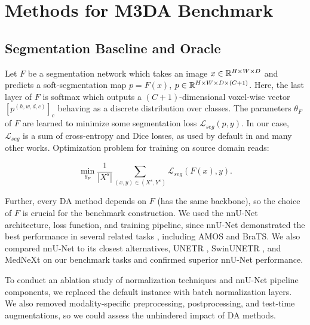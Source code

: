 


\section{Methods for M3DA Benchmark}
\label{sec:methods}




\subsection{Segmentation Baseline and Oracle}
\label{ssec:baseline}

Let $F$ be a segmentation network which takes an image $x \in \mathbb{R}^{H \times W \times D}$ and predicts a soft-segmentation map $p = F(x)$, $p \in \mathbb{R}^{H \times W \times D \times (C + 1)}$. Here, the last layer of $F$ is softmax which outputs a $(C+1)$-dimensional voxel-wise vector $\left[p^{(h, w, d, c)}\right]_c$ behaving as a discrete distribution over classes. The parameters $\theta_F$ of $F$ are learned to minimize some segmentation loss $\mathcal{L}_{seg} (p, y)$. In our case, $\mathcal{L}_{seg}$ is a sum of cross-entropy and Dice losses, as used by default in \cite{nnunet} and many other works. Optimization problem for training on source domain reads:

\[
\min_{\theta_F} \frac{1}{|X^s|} \sum_{(x, y) \in (X^s, Y^s)} \mathcal{L}_{seg} (F(x), y).
\]

Further, every DA method depends on $F$ (has the same backbone), so the choice of $F$ is crucial for the benchmark construction. We used the nnU-Net \cite{nnunet} architecture, loss function, and training pipeline, since nnU-Net demonstrated the best performance in several related tasks \cite{nnunet,amos,isensee2024nnu}, including AMOS and BraTS. We also compared nnU-Net to its closest alternatives, UNETR \cite{unetr}, SwinUNETR \cite{swinunetr}, and MedNeXt \cite{mednext} on our benchmark tasks and confirmed superior nnU-Net performance.

To conduct an ablation study of normalization techniques and nnU-Net pipeline components, we replaced the default instance with batch normalization layers. We also removed modality-specific preprocessing, postprocessing, and test-time augmentations, so we could assess the unhindered impact of DA methods.%

